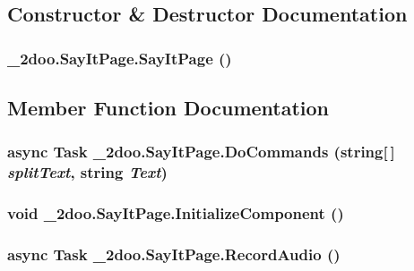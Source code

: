 \subsection{Constructor \& Destructor Documentation}
\hypertarget{class__2doo_1_1_say_it_page_7a5298e046d7b2c222f69373710f226c}{
\subsubsection[{SayItPage}]{\setlength{\rightskip}{0pt plus 5cm}\_\-2doo.SayItPage.SayItPage ()}}
\label{class__2doo_1_1_say_it_page_7a5298e046d7b2c222f69373710f226c}




\subsection{Member Function Documentation}
\hypertarget{class__2doo_1_1_say_it_page_1986a9932d3da9e435354a38a72a8b17}{
\subsubsection[{DoCommands}]{\setlength{\rightskip}{0pt plus 5cm}async Task \_\-2doo.SayItPage.DoCommands (string\mbox{[}$\,$\mbox{]} {\em splitText}, \/  string {\em Text})}}
\label{class__2doo_1_1_say_it_page_1986a9932d3da9e435354a38a72a8b17}


\hypertarget{class__2doo_1_1_say_it_page_c79aa5eec7664391a36b885ecb29ae45}{
\subsubsection[{InitializeComponent}]{\setlength{\rightskip}{0pt plus 5cm}void \_\-2doo.SayItPage.InitializeComponent ()}}
\label{class__2doo_1_1_say_it_page_c79aa5eec7664391a36b885ecb29ae45}


\hypertarget{class__2doo_1_1_say_it_page_42e69c719490a39d7472baa444a392c1}{
\subsubsection[{RecordAudio}]{\setlength{\rightskip}{0pt plus 5cm}async Task \_\-2doo.SayItPage.RecordAudio ()}}
\label{class__2doo_1_1_say_it_page_42e69c719490a39d7472baa444a392c1}


